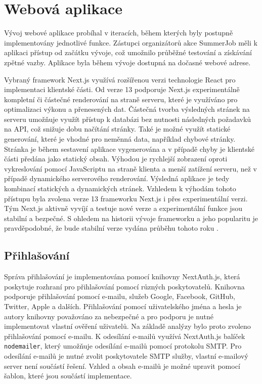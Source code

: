 \section{Webová aplikace}

Vývoj webové aplikace probíhal v iteracích, během kterých byly postupně implementovány jednotlivé funkce. Zástupci organizátorů akce SummerJob
měli k aplikaci přístup od začátku vývoje, což umožnilo průběžné testování a získávání zpětné vazby. Aplikace byla během vývoje dostupná na dočasné webové adrese.

Vybraný framework Next.js využívá rozšířenou verzi technologie React pro implementaci klientské části.
Od verze 13 podporuje Next.js experimentálně kompletní či částečné renderování na straně serveru, které je využíváno pro optimalizaci výkonu a přenesených dat.
Částečná tvorba výsledných stránek na serveru umožňuje využít přístup k databázi bez nutnosti následných požadavků na API, což snižuje dobu načítání stránky.
Také je možné využít statické generování, které je vhodné pro neměnná data, například chybové stránky. Stránka je během sestavení aplikace vygenerována a v případě chyby
je klientské části předána jako statický obsah. Výhodou je rychlejší zobrazení oproti vykreslování pomocí JavaScriptu na straně klienta a menší zatížení serveru, než v případě
dynamického serverového renderování. Výsledná aplikace je tedy kombinací statických a dynamických stránek. Vzhledem k výhodám tohoto přístupu byla zvolena verze 13 frameworku Next.js
i přes experimentální verzi. Tým Next.js aktivně vyvíjí a testuje nové verze a experimentální funkce jsou stabilní a bezpečné. S ohledem na historii
vývoje frameworku a jeho popularitu je pravděpodobné, že bude stabilní verze vydána průběhu tohoto roku \cite{nextjs_versions}.

\subsection{Přihlašování}

Správa přihlašování je implementována pomocí knihovny NextAuth.js, která poskytuje rozhraní pro přihlašování pomocí různých poskytovatelů. Knihovna podporuje
přihlašování pomocí e-mailu, služeb Google, Facebook, GitHub, Twitter, Apple a dalších. Přihlašování pomocí uživatelského jména a hesla je autory knihovny 
považováno za nebezpečné a pro podporu je nutné implementovat vlastní ověření uživatelů. Na základě analýzy bylo proto zvoleno přihlašování pomocí e-mailu.
K odesílání e-mailů využívá NextAuth.js balíček \texttt{nodemailer}, který umožňuje odesílání e-mailů pomocí protokolu SMTP. Pro odesílání e-mailů je nutné
zvolit poskytovatele SMTP služby, vlastní e-mailový server není součástí řešení. Vzhled a obsah e-mailů je možné upravit pomocí šablon, které jsou součástí
implementace.

